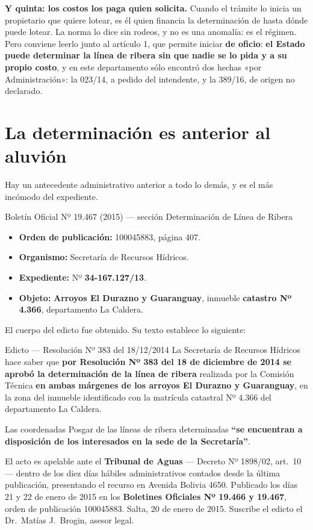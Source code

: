 \textbf{Y quinta: los costos los paga quien solicita.} Cuando el trámite lo inicia un
propietario que quiere lotear, es él quien financia la determinación de hasta dónde puede
lotear. La norma lo dice sin rodeos, y no es una anomalía: es el régimen. Pero conviene
leerlo junto al artículo 1, que permite iniciar \textbf{de oficio}: \textbf{el Estado puede
determinar la línea de ribera sin que nadie se lo pida y a su propio costo}, y en este
departamento sólo encontró dos hechas «por Administración»: la 023/14, a pedido del intendente, y la 389/16, de origen no declarado.

\section{La determinación es anterior al aluvión}

Hay un antecedente administrativo anterior a todo lo demás, y es el más incómodo del expediente.

\begin{ficha}{Boletín Oficial Nº 19.467 (2015) --- sección Determinación de Línea de Ribera}
\begin{itemize}[leftmargin=*,nosep]
\item \textbf{Orden de publicación:} 100045883, página 407.
\item \textbf{Organismo:} Secretaría de Recursos Hídricos.
\item \textbf{Expediente:} Nº \textbf{34-167.127/13}.
\item \textbf{Objeto:} \textbf{Arroyos El Durazno y Guaranguay}, inmueble \textbf{catastro Nº 4.366}, departamento La Caldera.
\end{itemize}
\end{ficha}

El cuerpo del edicto fue obtenido. Su texto establece lo siguiente:

\begin{ficha}{Edicto --- Resolución Nº 383 del 18/12/2014}
La Secretaría de Recursos Hídricos hace saber que \textbf{por Resolución Nº 383 del 18 de diciembre de 2014 se aprobó la determinación de la línea de ribera} realizada por la Comisión Técnica \textbf{en ambas márgenes de los arroyos El Durazno y Guaranguay}, en la zona del inmueble identificado con la matrícula catastral Nº 4.366 del departamento La Caldera.

Las coordenadas Posgar de las líneas de ribera determinadas \textbf{``se encuentran a disposición de los interesados en la sede de la Secretaría''}.

El acto es apelable ante el \textbf{Tribunal de Aguas} --- Decreto Nº 1898/02, art.\ 10 --- dentro de los diez días hábiles administrativos contados desde la última publicación, presentando el recurso en Avenida Bolivia 4650. Publicado los días 21 y 22 de enero de 2015 en los \textbf{Boletines Oficiales Nº 19.466 y 19.467}, orden de publicación 100045883. Salta, 20 de enero de 2015. Suscribe el edicto el Dr.\ Matías J.\ Brogin, asesor legal.
\end{ficha}

